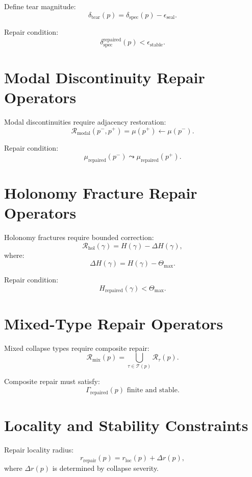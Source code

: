 \documentclass[11pt]{article}
\begin{document}
Define tear magnitude:
\[
\delta_{\mathrm{tear}}(p)
  = \delta_{\mathrm{spec}}(p) - \epsilon_{\mathrm{seal}}.
\]

Repair condition:
\[
\delta_{\mathrm{spec}}^{\mathrm{repaired}}(p)
  < \epsilon_{\mathrm{stable}}.
\]

\section{Modal Discontinuity Repair Operators}

Modal discontinuities require adjacency restoration:
\[
\mathcal{R}_{\mathrm{modal}}(p^- , p^+)
  = \mu(p^+) \leftarrow \mu(p^-).
\]

Repair condition:
\[
\mu_{\mathrm{repaired}}(p^-) \leadsto \mu_{\mathrm{repaired}}(p^+).
\]

\section{Holonomy Fracture Repair Operators}

Holonomy fractures require bounded correction:
\[
\mathcal{R}_{\mathrm{hol}}(\gamma)
  = H(\gamma) - \Delta H(\gamma),
\]
where:
\[
\Delta H(\gamma) = H(\gamma) - \Theta_{\max}.
\]

Repair condition:
\[
H_{\mathrm{repaired}}(\gamma) < \Theta_{\max}.
\]

\section{Mixed-Type Repair Operators}

Mixed collapse types require composite repair:
\[
\mathcal{R}_{\mathrm{mix}}(p)
  = \bigcup_{\tau \in \mathcal{T}(p)} \mathcal{R}_{\tau}(p).
\]

Composite repair must satisfy:
\[
\Gamma_{\mathrm{repaired}}(p) \text{ finite and stable}.
\]

\section{Locality and Stability Constraints}

Repair locality radius:
\[
r_{\mathrm{repair}}(p)
  = r_{\mathrm{loc}}(p) + \Delta r(p),
\]
where $\Delta r(p)$ is determined by collapse severity.
\end{document}
